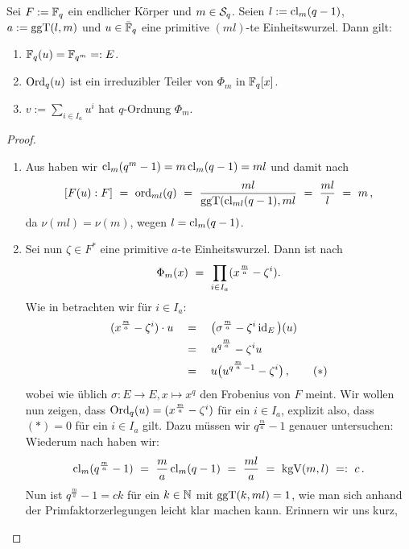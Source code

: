 \begin{satz}
  \label{satz:konstruktion_q_ordnung}
  Sei $F := \F_q$ ein endlicher Körper und $m \in \S_q$. Seien
  $l := \cl_m(q-1)$, $a := \ggT(l,m)$ und $u \in \bar\F_q$ eine primitive
  $(ml)$-te Einheitswurzel. Dann gilt:
  \begin{enumerate}
    \item $\F_q(u) = \F_{q^m} =: E$.
    \item $\Ord_q(u)$ ist ein irreduzibler Teiler von $\Phi_m$ in $\F_q[x]$.
    \item $v := \sum_{i \in I_a} u^i$ hat $q$-Ordnung $\Phi_m$.
  \end{enumerate}
\end{satz}
\begin{proof}
  \begin{enumerate}
  \item Aus  haben wir 
   $\cl_m(q^m-1) = m\cl_m(q-1) = ml$ und
    damit nach  
    \[ [F(u):F] \speq= \ord_{ml}(q) \speq= 
      \frac{ml}{\ggT(\cl_{ml}(q-1), ml} \speq=
      \frac{ml}{l} \speq= m\,,\]
    da $\nu(ml) = \nu(m)$, wegen $l = \cl_m(q-1)$.
  \item Sei nun $\zeta \in F^\ast$ eine primitive $a$-te Einheitswurzel. Dann
    ist nach 
    \[ \Phi_m(x) \speq= \prod_{i\in I_a} (x^{\frac m a} - \zeta^i).\]
    Wie in  betrachten wir für $i \in I_a$:
    \begin{align*}
      (x^{\frac m a} - \zeta^i)\cdot u 
      \quad&=\quad \big( \sigma^{\frac m a} - \zeta^i \id_E \big)(u)\\
        &=\quad u^{q^{\frac m a}} - \zeta^i u \\
        &=\quad u\big( u^{q^{\frac m a}-1} - \zeta^i \big)\,, \tag{$\ast$}
    \end{align*}
    wobei wie üblich $\sigma: E \to E, x \mapsto x^q$ den Frobenius von
    $F$ meint. Wir wollen nun zeigen, dass $\Ord_q(u) = (x^{\frac m a} -
    \zeta^i)$ für ein $i\in I_a$, explizit also, dass $(\ast) = 0$ für ein
    $i\in I_a$ gilt. Dazu müssen wir $q^{\frac m a} -1$ genauer untersuchen:
    Wiederum nach  haben wir:
    \[ \cl_m(q^{\frac m a} -1 ) \speq= \frac m a \cl_m(q-1) \speq=
      \frac{ml}{a} \speq= \kgV(m,l) \speq{=:} c\,.\]
    Nun ist $q^{\frac m a}-1 = ck$ für 
    ein $k\in\N$ mit $\ggT(k,ml) = 1$, wie man sich anhand der 
    Primfaktorzerlegungen leicht klar machen kann. Erinnern wir uns kurz, 

\end{enumerate}
\end{proof}

